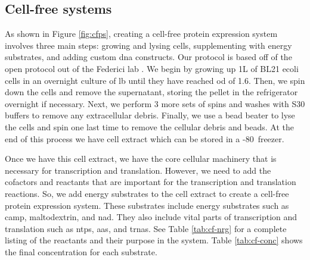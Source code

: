 \subsection{Cell-free systems}
As shown in Figure \ref{fig:cfps}, creating a cell-free protein expression system involves three main steps: growing and lysing cells, supplementing with energy substrates, and adding custom \gls{dna} constructs.
Our protocol is based off of the open protocol out of the Federici lab \cite{medina2017cfps}.
We begin by growing up 1L of BL21 \gls{ecoli} cells in an overnight culture of \gls{lb} until they have reached \gls{od} of 1.6.
Then, we spin down the cells and remove the supernatant, storing the pellet in the refrigerator overnight if necessary.
Next, we perform 3 more sets of spins and washes with S30 buffers to remove any extracellular debris.
Finally, we use a bead beater to lyse the cells and spin one last time to remove the cellular debris and beads.
At the end of this process we have cell extract which can be stored in a -80\degree~freezer.

Once we have this cell extract, we have the core cellular machinery that is necessary for transcription and translation.
However, we need to add the cofactors and reactants that are important for the transcription and translation reactions.
So, we add energy substrates to the cell extract to create a cell-free protein expression system.
These substrates include energy substrates such as \gls{camp}, maltodextrin, and \gls{nad}.
They also include vital parts of transcription and translation such as \glspl{ntp}, \glspl{aa}, and \glspl{trna}.
See Table \ref{tab:cf-nrg} for a complete listing of the reactants and their purpose in the system.
Table \ref{tab:cf-conc} shows the final concentration for each substrate.


